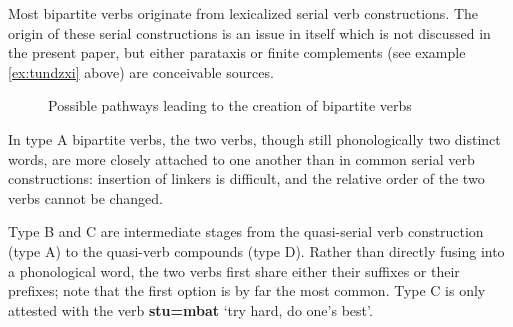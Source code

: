 \documentclass[oneside,a4paper,11pt]{article}
\newcommand{\ipa}[1]{{\phon\textbf{#1}}}
\newcommand{\jpg}[2]{\ipa{#1} `#2'}
\begin{document}
Most bipartite verbs originate from lexicalized serial verb constructions. The origin of these serial constructions is an issue in itself which is not discussed in the present paper, but either parataxis or finite complements (see example \ref{ex:tundzxi} above) are conceivable sources.


   \begin{figure}[H]
   \caption{Possible pathways leading to the creation of bipartite verbs} \label{fig:bipartite.pathways}  
\end{figure}

In type A bipartite verbs, the two verbs, though still phonologically two distinct words, are more closely attached to one another than in common serial verb constructions: insertion of linkers is difficult, and the relative order of the two verbs cannot be changed.

Type B and C are intermediate stages from the quasi-serial verb construction (type A) to the quasi-verb compounds (type D). Rather than directly fusing into a phonological word, the two verbs first share either their suffixes or their prefixes; note that the first option is by far the most common. Type C is only attested with the verb \jpg{stu=mbat}{try hard, do one's best}.
\end{document}
